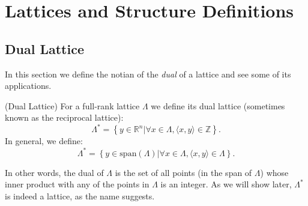 \chapter{Lattices and Structure Definitions}
\adjustmtc
\minitoc
\section{Dual Lattice}
In this section we define the notian of the \textit{dual} of a lattice and see some of its applications.
\begin{definition}(Dual Lattice)
For a full-rank lattice $\Lambda$ we define its dual lattice (sometimes known
as the reciprocal lattice):
\begin{equation}
\Lambda^* = \left\{y\in\mathbb{R}^n\vert \forall x \in \Lambda, \langle x,y
\rangle \in \mathbb{Z}\right\}.
\end{equation}
In general, we define:
\begin{equation}
  \Lambda^* = \left\{y\in\mathrm{span}(\Lambda)\vert\forall x\in \Lambda,
  \langle x,y \rangle\in \Lambda\right\}.
\end{equation}
\end{definition}
In other words, the dual of $\Lambda$ is the set of all points (in the span of
$\Lambda$) whose inner product with any of the points in $\Lambda$ is an
integer. As we will show later, $\Lambda^*$ is indeed a lattice, as the name
suggests.

